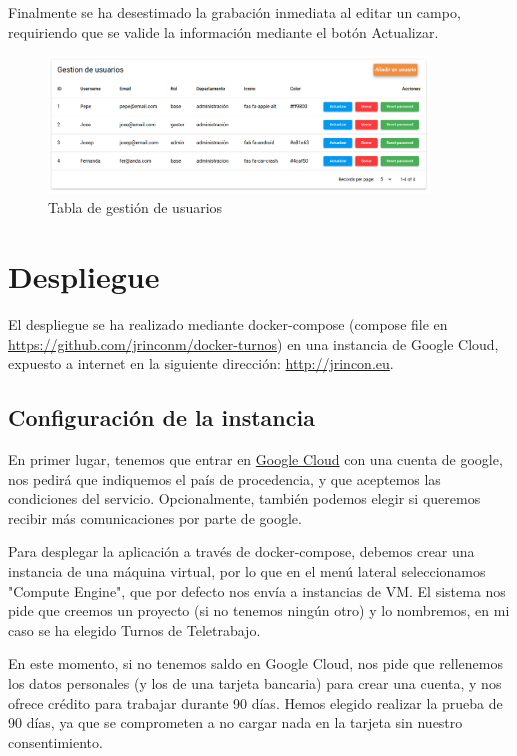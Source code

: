 \documentclass[11pt,spanish,listoffigures,listoftables]{tfgetsinf}
\begin{document}
Finalmente se ha desestimado la grabación inmediata al editar un campo, requiriendo que se valide la información mediante el botón Actualizar.

\begin{figure}[ht!] %
  \includegraphics[width=0.90\textwidth]{img/gestionusuarioweb.png}
  \caption{Tabla de gestión de usuarios}
  \label{fig:gestionusuarios}
\end{figure}

\chapter{Despliegue}

El despliegue se ha realizado mediante docker-compose (compose file en \url{https://github.com/jrinconm/docker-turnos}) en una instancia de Google Cloud, expuesto a internet en la siguiente dirección:
\url{http://jrincon.eu}.

\section{Configuración de la instancia}
En primer lugar, tenemos que entrar en \href{https://console.cloud.google.com/}{Google Cloud} con una cuenta de google, nos pedirá que indiquemos el país de procedencia, y que aceptemos las condiciones del servicio.
Opcionalmente, también podemos elegir si queremos recibir más comunicaciones por parte de google.

Para desplegar la aplicación a través de docker-compose, debemos crear una instancia de una máquina virtual, por lo que en el menú lateral seleccionamos "Compute Engine", que por defecto nos envía a instancias de VM.
El sistema nos pide que creemos un proyecto (si no tenemos ningún otro) y lo nombremos, en mi caso se ha elegido Turnos de Teletrabajo.

En este momento, si no tenemos saldo en Google Cloud, nos pide que rellenemos los datos personales (y los de una tarjeta bancaria) para crear una cuenta, y nos ofrece crédito para trabajar durante 90 días. 
Hemos elegido realizar la prueba de 90 días, ya que se comprometen a no cargar nada en la tarjeta sin nuestro consentimiento.
\end{document}

